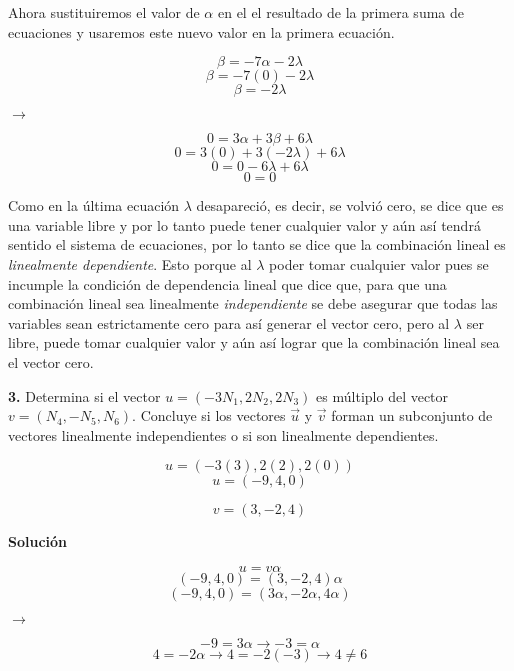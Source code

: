 \documentclass{article}
\begin{document}
Ahora sustituiremos el valor de $\alpha$ en el el resultado de la primera suma de ecuaciones y usaremos este nuevo
valor en la primera ecuación.


\begin{minipage}[c]{0.5cm}
   $$\beta = -7\alpha -2\lambda$$
   $$\beta = -7(0) -2\lambda$$
   $$\beta = -2\lambda$$
\end{minipage}\hspace*{3cm}
$\rightarrow$\hspace*{1.5cm}
\begin{minipage}[c]{0.5cm}
   $$0 = 3\alpha +3\beta+ 6\lambda$$
   $$0 = 3(0) +3(-2\lambda)+ 6\lambda$$
   $$0 = 0-6\lambda+ 6\lambda$$
   $$0 = 0$$
\end{minipage}
\vspace{10pt}


Como en la última ecuación $\lambda$ desapareció, es decir, se volvió cero, se dice que es una variable libre y por lo tanto
puede tener cualquier valor y aún así tendrá sentido el sistema de ecuaciones, por lo tanto se dice que la combinación lineal
es \emph{linealmente dependiente}.
Esto porque al $\lambda$ poder tomar cualquier valor pues se incumple la condición de dependencia lineal que dice que, para que
una combinación lineal sea linealmente \emph{independiente} se debe asegurar que todas las variables sean estrictamente cero para
así generar el vector cero, pero al $\lambda$ ser libre, puede tomar cualquier valor y aún así lograr que la combinación lineal sea
el vector cero.
\newpage


\textbf{3.} Determina si el vector $u = (-3N_1,2N_2,2N_3)$ es múltiplo del vector $v = (N_4,-N_5,N_6)$. Concluye si los vectores $\vec{u}$ y $\vec{v}$ forman
un subconjunto de vectores linealmente independientes o si son linealmente dependientes.


\begin{minipage}[c]{0.5cm}
   $$u = (-3(3), 2(2), 2(0))$$
   $$u = (-9, 4, 0)$$
\end{minipage}\hspace*{5cm}
\begin{minipage}[c]{0.5cm}
   $$v = (3, -2, 4)$$
\end{minipage}
\vspace{10pt}


\textbf{Solución}


\begin{minipage}[c]{0.5cm}
   $$u = v\alpha  $$
   $$(-9, 4, 0) = (3, -2, 4)\alpha$$
   $$(-9, 4, 0) = (3\alpha, -2\alpha, 4\alpha)$$
\end{minipage}\hspace*{4cm}
$\rightarrow$\hspace*{1.5cm}
\begin{minipage}[c]{0.5cm}
   $$-9 = 3\alpha \rightarrow -3=\alpha$$
   $$4 = -2\alpha \rightarrow 4=-2(-3) \rightarrow 4 \neq 6$$
\end{minipage}
\vspace*{10pt}
\end{document}

